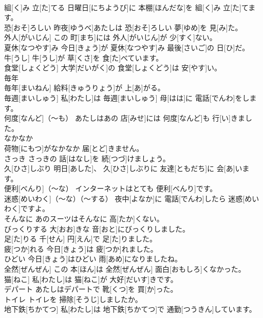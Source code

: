 \documentclass[8pt]{extreport}
\begin{document}
\begin{CJK}{UTF8}{min}
\\	組[く]み 立[た]てる	日曜日[にちようび]に 本棚[ほんだな]を 組[く]み 立[た]てます。		
\\	恐[おそ]ろしい	昨夜[ゆうべ]あたしは 恐[おそ]ろしい 夢[ゆめ]を 見[み]た。		
\\	外人[がいじん]	この 町[まち]には 外人[がいじん]が 少[すく]ない。		
\\	夏休[なつやす]み	今日[きょう]が 夏休[なつやす]み 最後[さいご]の 日[ひ]だ。		
\\	牛[うし]	牛[うし]が 草[くさ]を 食[た]べています。		
\\	食堂[しょくどう]	大学[だいがく]の 食堂[しょくどう]は 安[やす]い。		
\\	毎年
\\	[まいねん]	毎年[まいねん] 給料[きゅうりょう]が 上[あ]がる。		
\\	毎週[まいしゅう]	私[わたし]は 毎週[まいしゅう] 母[はは]に 電話[でんわ]をします。		
\\	何度[なんど]（～も）	あたしはあの 店[みせ]には 何度[なんど]も 行[い]きました。		
\\	なかなか
\\	荷物[にもつ]がなかなか 届[とど]きません。		
\\	さっき	さっきの 話[はなし]を 続[つづ]けましょう。		
\\	久[ひさ]しぶり	明日[あした]、 久[ひさ]しぶりに 友達[ともだち]に 会[あ]います。		
\\	便利[べんり]（～な）	インターネットはとても 便利[べんり]です。		
\\	迷惑[めいわく]（～な）（～する）	夜中[よなか]に 電話[でんわ]したら 迷惑[めいわく]ですよ。		
\\	そんなに	あのスーツはそんなに 高[たか]くない。		
\\	びっくりする	大[おお]きな 音[おと]にびっくりしました。		
\\	足[た]りる	千[せん] 円[えん]で 足[た]りました。		
\\	疲[つか]れる	今日[きょう]は 疲[つか]れました。		
\\	ひどい	今日[きょう]はひどい 雨[あめ]になりましたね。		
\\	全然[ぜんぜん]	この 本[ほん]は 全然[ぜんぜん] 面白[おもしろ]くなかった。		
\\	猫[ねこ]	私[わたし]は 猫[ねこ]が 大好[だいす]きです。		
\\	デパート	あたしはデパートで 靴[くつ]を 買[か]った。		
\\	トイレ	トイレを 掃除[そうじ]しましたか。		
\\	地下鉄[ちかてつ]	私[わたし]は 地下鉄[ちかてつ]で 通勤[つうきん]しています。		

\end{CJK}
\end{document}
